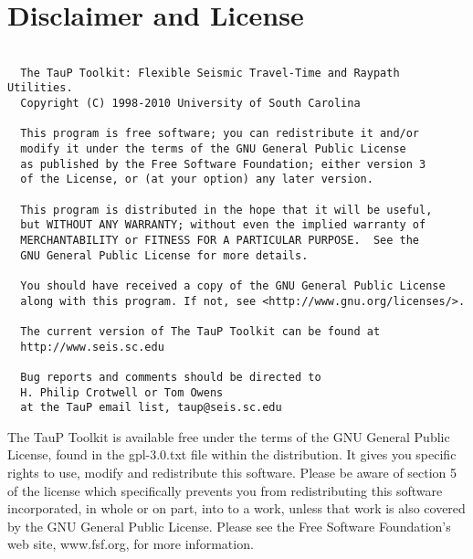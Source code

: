 
\section*{Disclaimer and License}
\begin{verbatim}

  The TauP Toolkit: Flexible Seismic Travel-Time and Raypath Utilities.
  Copyright (C) 1998-2010 University of South Carolina

  This program is free software; you can redistribute it and/or
  modify it under the terms of the GNU General Public License
  as published by the Free Software Foundation; either version 3
  of the License, or (at your option) any later version.

  This program is distributed in the hope that it will be useful,
  but WITHOUT ANY WARRANTY; without even the implied warranty of
  MERCHANTABILITY or FITNESS FOR A PARTICULAR PURPOSE.  See the
  GNU General Public License for more details.

  You should have received a copy of the GNU General Public License
  along with this program. If not, see <http://www.gnu.org/licenses/>.

  The current version of The TauP Toolkit can be found at 
  http://www.seis.sc.edu

  Bug reports and comments should be directed to 
  H. Philip Crotwell or Tom Owens
  at the TauP email list, taup@seis.sc.edu

\end{verbatim}

The TauP Toolkit is available free under the terms of the GNU General Public 
License, found in the gpl-3.0.txt file within the distribution. It gives you 
specific rights to use, modify and redistribute this software. Please be
aware of section 5 of the license which specifically prevents you from 
redistributing this software incorporated, in whole
or on part, into to a work, unless that work is also covered by the 
GNU General Public License. Please see the Free Software Foundation's
web site, www.fsf.org, for more information.

